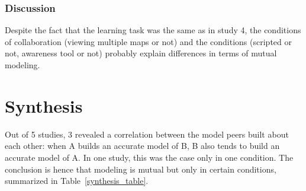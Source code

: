 \documentclass[twocolumn]{article}
\begin{document}
\subsubsection*{Discussion}

Despite the fact that the learning task was the same as in study 4, the
conditions of collaboration (viewing multiple maps or not) and the conditions
(scripted or not, awareness tool or not) probably explain differences in terms
of mutual modeling.

\section{Synthesis}

Out of 5 studies, 3 revealed a correlation between the model peers built about
each other: when A builds an accurate model of B, B also tends to build an
accurate model of A.  In one study, this was the case only in one condition.
The conclusion is hence that modeling is mutual but only in certain conditions,
summarized in Table~\ref{synthesis_table}.
\end{document}
